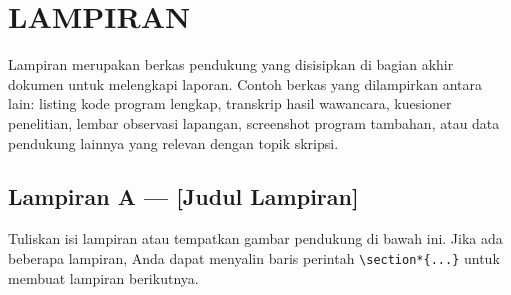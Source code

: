 \clearpage
\chapter*{LAMPIRAN}
\label{lamp:lampiran-utama}
\appendix

Lampiran merupakan berkas pendukung yang disisipkan di bagian akhir dokumen untuk melengkapi laporan. Contoh berkas yang dilampirkan antara lain: listing kode program lengkap, transkrip hasil wawancara, kuesioner penelitian, lembar observasi lapangan, screenshot program tambahan, atau data pendukung lainnya yang relevan dengan topik skripsi.

\section*{Lampiran A --- [Judul Lampiran]}
\noindent
Tuliskan isi lampiran atau tempatkan gambar pendukung di bawah ini. Jika ada beberapa lampiran, Anda dapat menyalin baris perintah \texttt{\textbackslash{}section*\{...\}} untuk membuat lampiran berikutnya.
